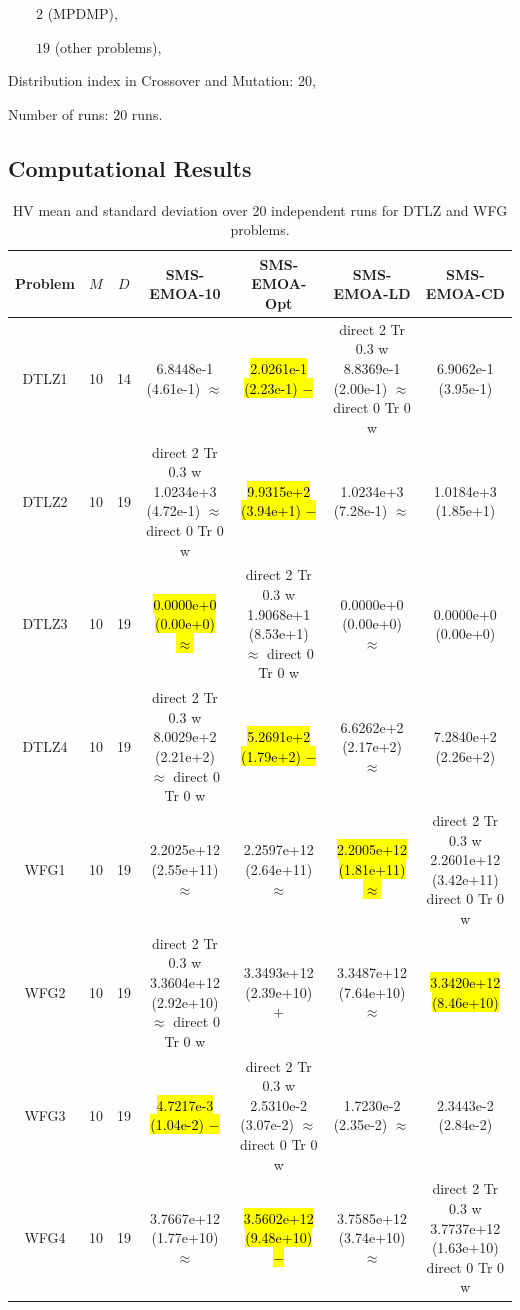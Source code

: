 \documentclass[conference]{IEEEtran}
\newcommand{\semitextbf}[1]{%
	\pdfliteral direct {2 Tr 0.3 w} %
	#1%
	\pdfliteral direct {0 Tr 0 w}%
}
\begin{document}
$\qquad 2$ (MPDMP),

$\qquad 19$ (other problems),

Distribution index in Crossover and Mutation: 20, 

Number of runs: 20 runs.

% 
\subsection{Computational Results}

\begin{table}[!t]\small
  \caption{HV mean and standard deviation over 20 independent runs for DTLZ and WFG problems.}
  \label{table_tri}
  \centering
  \begin{tabular}{ccccccc}
    \toprule
    Problem&$M$&$D$&SMS-EMOA-10&SMS-EMOA-Opt&SMS-EMOA-LD&SMS-EMOA-CD\\ 
    \midrule
    \multirow{1}{*}{DTLZ1}&10&14&6.8448e-1 (4.61e-1) $\approx$&\hl{2.0261e-1 (2.23e-1) $-$}&\semitextbf{8.8369e-1 (2.00e-1) $\approx$}&6.9062e-1 (3.95e-1)\\
    \multirow{1}{*}{DTLZ2}&10&19&\semitextbf{1.0234e+3 (4.72e-1) $\approx$}&\hl{9.9315e+2 (3.94e+1) $-$}&1.0234e+3 (7.28e-1) $\approx$&1.0184e+3 (1.85e+1)\\
    \multirow{1}{*}{DTLZ3}&10&19&\hl{0.0000e+0 (0.00e+0) $\approx$}&\semitextbf{1.9068e+1 (8.53e+1) $\approx$}&0.0000e+0 (0.00e+0) $\approx$&0.0000e+0 (0.00e+0)\\
    \multirow{1}{*}{DTLZ4}&10&19&\semitextbf{8.0029e+2 (2.21e+2) $\approx$}&\hl{5.2691e+2 (1.79e+2) $-$}&6.6262e+2 (2.17e+2) $\approx$&7.2840e+2 (2.26e+2)\\
    \hline
    \multirow{1}{*}{WFG1}&10&19&2.2025e+12 (2.55e+11) $\approx$&2.2597e+12 (2.64e+11) $\approx$&\hl{2.2005e+12 (1.81e+11) $\approx$}&\semitextbf{2.2601e+12 (3.42e+11)}\\
    \multirow{1}{*}{WFG2}&10&19&\semitextbf{3.3604e+12 (2.92e+10) $\approx$}&3.3493e+12 (2.39e+10) $+$&3.3487e+12 (7.64e+10) $\approx$&\hl{3.3420e+12 (8.46e+10)}\\
    \multirow{1}{*}{WFG3}&10&19&\hl{4.7217e-3 (1.04e-2) $-$}&\semitextbf{2.5310e-2 (3.07e-2) $\approx$}&1.7230e-2 (2.35e-2) $\approx$&2.3443e-2 (2.84e-2)\\
    \multirow{1}{*}{WFG4}&10&19&3.7667e+12 (1.77e+10) $\approx$&\hl{3.5602e+12 (9.48e+10) $-$}&3.7585e+12 (3.74e+10) $\approx$&\semitextbf{3.7737e+12 (1.63e+10)}\\

\end{tabular}
\end{table}
\end{document}
